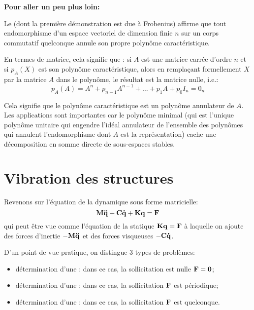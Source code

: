 \medskip
{}
\textbf{Pour aller un peu plus loin:}

Le  
(dont la première démonstration est due à Frobenius)
affirme que tout endomorphisme d'un espace vectoriel de dimension finie $n$ sur un corps commutatif quelconque 
annule son propre polynôme caractéristique.

En termes de matrice, cela signifie que : si $A$ est une matrice carrée d'ordre $n$ et si 
$p_A(X)$ est son polynôme caractéristique, alors en remplaçant formellement 
$X$ par la matrice $A$ dans le polynôme, le résultat est la matrice nulle, i.e.:
\begin{equation}p_A(A)= A^n + p_{n-1}A^{n-1} + \ldots + p_1 A + p_0 I_n = 0_n \end{equation}

Cela signifie que le polynôme caractéristique est un 
polynôme annulateur de $A$.
Les applications sont importantes car le polynôme minimal (qui est l'unique polynôme unitaire qui
engendre l'idéal annulateur de l'ensemble des polynômes qui annulent l'endomorphisme dont $A$
est la représentation) cache une décomposition en somme  directe de sous-espaces stables. 










\medskip
\section{Vibration des structures}

\medskip
Revenons sur l'équation de la dynamique sous forme matricielle:
\begin{equation} \mathbf{M}\mathbf{\ddot{q}}+\mathbf{C}\mathbf{\dot{q}}+\mathbf{K}\mathbf{q}=\mathbf{F} \end{equation}
qui peut être vue comme l'équation de la statique $\mathbf{K}\mathbf{q}=\mathbf{F}$ à laquelle on
ajoute des forces d'inertie $-\mathbf{M}\mathbf{\ddot{q}}$ et des forces visqueuses
$-\mathbf{C}\mathbf{\dot{q}}$.

\medskip
D'un point de vue pratique, on distingue 3 types de problèmes:
\begin{itemize}
   \item détermination d'une : 
	dans ce cas, la sollicitation est nulle $\mathbf{F} = \mathbf{0}$;
   \item détermination d'une :
 	dans ce cas, la sollicitation $\mathbf{F}$ est périodique;
   \item détermination d'une : 
	dans ce cas, la sollicitation $\mathbf{F}$ est quelconque.
\end{itemize}

